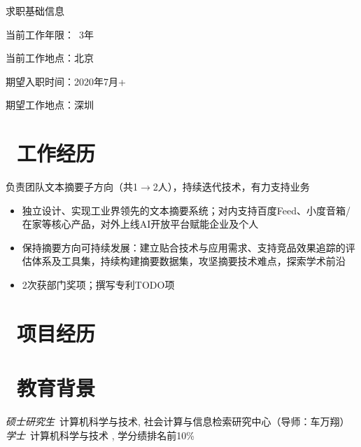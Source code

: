 \documentclass{resume}
\begin{document}




求职基础信息

当前工作年限：~3年

当前工作地点：北京

期望入职时间：2020年7月+ 

期望工作地点：深圳

\section{\faUsers\ 工作经历}

\begin{onehalfspacing}
负责团队文本摘要子方向（共1$ \rightarrow $2人），持续迭代技术，有力支持业务
\begin{itemize}
  \item 独立设计、实现工业界领先的文本摘要系统；对内支持百度Feed、小度音箱/在家等核心产品，对外上线AI开放平台赋能企业及个人
  \item 保持摘要方向可持续发展：建立贴合技术与应用需求、支持竞品效果追踪的评估体系及工具集，持续构建摘要数据集，攻坚摘要技术难点，探索学术前沿
  \item 2次获部门奖项；撰写专利TODO项
\end{itemize}
\end{onehalfspacing}

\section{\faUsers\ 项目经历}
\datedsubsection{}{}
\role{}{}

\section{\faGraduationCap\  教育背景}
\textit{硕士研究生}\ 计算机科学与技术, 社会计算与信息检索研究中心（导师：车万翔）
\textit{学士}\ 计算机科学与技术 , 学分绩排名前10\%
\end{document}
